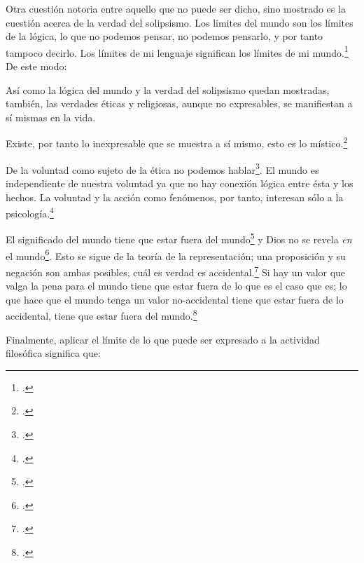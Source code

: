     Otra cuestión notoria entre aquello que no puede ser dicho, sino mostrado es la
    cuestión acerca de la verdad del solipsismo. Los limites del mundo son los
    límites de la lógica, lo que no podemos pensar, no podemos pensarlo, y por tanto
    tampoco decirlo. Los límites de mi lenguaje significan los límites de mi
    mundo.\footcite[cf~.][5.6~y~5.61]{tractatus} De este modo:

    Así como la lógica del mundo y la verdad del solipsismo quedan mostradas,
    también, las verdades éticas y religiosas, aunque no expresables, se manifiestan
    a sí mismas en la vida. 

    Existe, por tanto lo inexpresable que se muestra a sí mismo, esto es lo
    místico.\footcite[cf.~][6.522]{tractatus}

    De la voluntad como sujeto de la ética no podemos
    hablar\footcite[cf.~][6.423]{tractatus}. El mundo es independiente de nuestra
    voluntad ya que no hay conexión lógica entre ésta y los hechos.
    La voluntad y la acción como fenómenos, por tanto, interesan sólo a la
    psicología.\footcite[cf.~][p.171 \S3]{IWT}

    El significado del mundo tiene que estar fuera del
    mundo\footcite[cf.~][6.41]{tractatus} y Dios no se revela \emph{en} el
    mundo\footcite[cf.~][6.432]{tractatus}. 
    Esto se sigue de la teoría de la representación; una proposición y su negación
    son ambas posibles, cuál es verdad es accidental.\footcite[cf.~][p.170 \S4]{IWT}
    Si hay un valor que valga la pena para el mundo tiene que estar fuera de lo que
    es el caso que es; lo que hace que el mundo tenga un valor no-accidental tiene
    que estar fuera de lo accidental, tiene que estar fuera del
    mundo.\footcite[cf.~][6.41]{tractatus} 

    Finalmente, aplicar el límite de lo que puede ser expresado a la actividad
    filosófica significa que:

